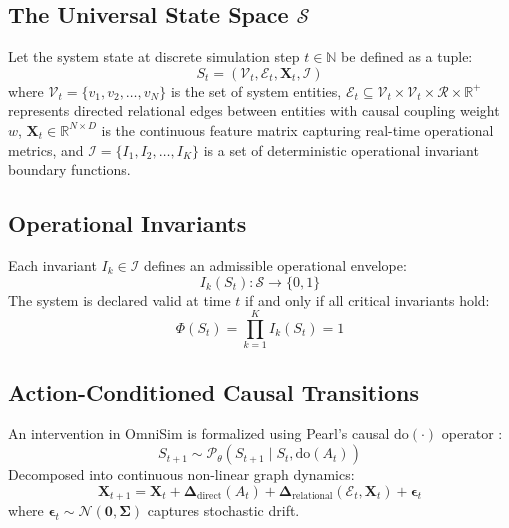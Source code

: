 \documentclass[10pt,twocolumn,letterpaper]{article}
\begin{document}
\subsection{The Universal State Space $\mathcal{S}$}
Let the system state at discrete simulation step $t \in \mathbb{N}$ be defined as a tuple:
\begin{equation}
S_t = (\mathcal{V}_t, \mathcal{E}_t, \mathbf{X}_t, \mathcal{I})
\end{equation}
where $\mathcal{V}_t = \{v_1, v_2, \dots, v_N\}$ is the set of system entities, $\mathcal{E}_t \subseteq \mathcal{V}_t \times \mathcal{V}_t \times \mathcal{R} \times \mathbb{R}^+$ represents directed relational edges between entities with causal coupling weight $w$, $\mathbf{X}_t \in \mathbb{R}^{N \times D}$ is the continuous feature matrix capturing real-time operational metrics, and $\mathcal{I} = \{I_1, I_2, \dots, I_K\}$ is a set of deterministic operational invariant boundary functions.

\subsection{Operational Invariants}
Each invariant $I_k \in \mathcal{I}$ defines an admissible operational envelope:
\begin{equation}
I_k(S_t) : \mathcal{S} \to \{0, 1\}
\end{equation}
The system is declared valid at time $t$ if and only if all critical invariants hold:
\begin{equation}
\Phi(S_t) = \prod_{k=1}^K I_k(S_t) = 1
\end{equation}

\subsection{Action-Conditioned Causal Transitions}
An intervention in OmniSim is formalized using Pearl's causal $\text{do}(\cdot)$ operator \cite{pearl2009causality}:
\begin{equation}
S_{t+1} \sim \mathcal{P}_\theta(S_{t+1} \mid S_t, \text{do}(A_t))
\end{equation}
Decomposed into continuous non-linear graph dynamics:
\begin{equation}
\mathbf{X}_{t+1} = \mathbf{X}_t + \mathbf{\Delta}_{\text{direct}}(A_t) + \mathbf{\Delta}_{\text{relational}}(\mathcal{E}_t, \mathbf{X}_t) + \boldsymbol{\epsilon}_t
\end{equation}
where $\boldsymbol{\epsilon}_t \sim \mathcal{N}(\mathbf{0}, \boldsymbol{\Sigma})$ captures stochastic drift.
\end{document}
